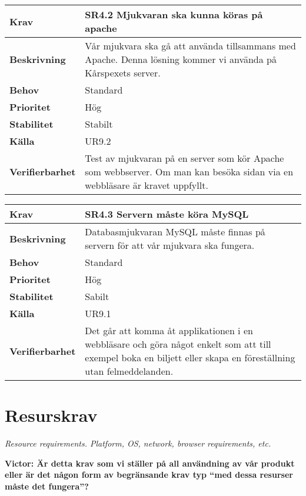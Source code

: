 \documentclass[a4paper, twoside, 11pt, titlepage]{article}
\begin{document}
\begin{tabular} { p{2.6cm} p{12.5cm} }
	\hline
	\sffamily\textbf{Krav} & \sffamily\textbf{SR4.2 Mjukvaran ska kunna köras på apache } \\
	\hline
	\sffamily\textbf{Beskrivning} & Vår mjukvara ska gå att använda tillsammans med Apache. Denna lösning kommer vi använda på Kårspexets server.  \\
	\hline
	\sffamily\textbf{Behov} & Standard  \\
	\hline
	\sffamily\textbf{Prioritet} & Hög  \\
	\hline
	\sffamily\textbf{Stabilitet} & Stabilt  \\
	\hline
	\sffamily\textbf{Källa} & UR9.2  \\
	\hline
	\sffamily\textbf{Verifierbarhet} & Test av mjukvaran på en server som kör Apache som webbserver. Om man kan besöka sidan via en webbläsare är kravet uppfyllt.  \\
	\hline
\end{tabular}
\vspace{6mm}

\begin{tabular} { p{2.6cm} p{12.5cm} }
	\hline
	\sffamily\textbf{Krav} & \sffamily\textbf{SR4.3 Servern måste köra MySQL } \\
	\hline
	\sffamily\textbf{Beskrivning} & Databasmjukvaran MySQL måste finnas på servern för att vår mjukvara ska fungera.  \\
	\hline
	\sffamily\textbf{Behov} & Standard  \\
	\hline
	\sffamily\textbf{Prioritet} & Hög  \\
	\hline
	\sffamily\textbf{Stabilitet} & Sabilt  \\
	\hline
	\sffamily\textbf{Källa} & UR9.1  \\
	\hline
	\sffamily\textbf{Verifierbarhet} & Det går att komma åt applikationen i en webbläsare och göra något enkelt som att till exempel boka en biljett eller skapa en föreställning utan felmeddelanden.  \\
	\hline
\end{tabular}


\clearpage
\section{Resurskrav}


\emph{Resource requirements. Platform, OS, network, browser requirements, etc.}

\textbf{Victor: Är detta krav som vi ställer på all användning av vår produkt eller är det någon form av begränsande krav typ ``med dessa resurser måste det fungera''?}
\end{document}
